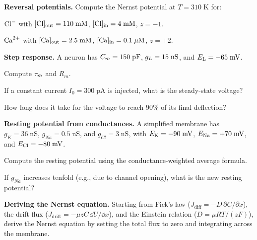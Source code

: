 \begin{exercises}
  \item \textbf{Reversal potentials.}
  Compute the Nernst potential at $T = 310\;\text{K}$ for:
  \begin{parts}
    \item $\mathrm{Cl}^-$ with $[\mathrm{Cl}]_{\text{out}} = 110\;\text{mM}$, $[\mathrm{Cl}]_{\text{in}} = 4\;\text{mM}$, $z = -1$.
    \item $\mathrm{Ca}^{2+}$ with $[\mathrm{Ca}]_{\text{out}} = 2.5\;\text{mM}$, $[\mathrm{Ca}]_{\text{in}} = 0.1\;\mu\text{M}$, $z = +2$.
  \end{parts}

  \item \textbf{Step response.}
  A neuron has $C_m = 150\;\text{pF}$, $g_L = 15\;\text{nS}$, and $E_{\mathrm{L}} = -65\;\text{mV}$.
  \begin{parts}
    \item Compute $\tau_m$ and $R_m$.
    \item If a constant current $I_0 = 300\;\text{pA}$ is injected, what is the steady-state voltage?
    \item How long does it take for the voltage to reach $90\%$ of its final deflection?
  \end{parts}

  \item \textbf{Resting potential from conductances.}
  A simplified membrane has $g_K = 36\;\text{nS}$, $g_{Na} = 0.5\;\text{nS}$, and $g_{Cl} = 3\;\text{nS}$, with $E_{\mathrm{K}} = -90\;\text{mV}$, $E_{\mathrm{Na}} = +70\;\text{mV}$, and $E_{\mathrm{Cl}} = -80\;\text{mV}$.
  \begin{parts}
    \item Compute the resting potential using the conductance-weighted average formula.
    \item If $g_{Na}$ increases tenfold (e.g., due to channel opening), what is the new resting potential?
  \end{parts}

  \item \textbf{Deriving the Nernst equation.}
  Starting from Fick's law ($J_{\text{diff}} = -D\,\partial C/\partial x$), the drift flux ($J_{\text{drift}} = -\mu z C\,\dd U/\dd x$), and the Einstein relation ($D = \mu RT/(zF)$), derive the Nernst equation by setting the total flux to zero and integrating across the membrane.


\end{exercises}
